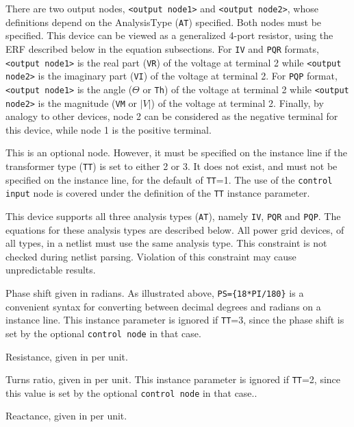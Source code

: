 \begin{Device}
\begin{Parameters}
There are two output nodes, \texttt{<output node1>} and \texttt{<output node2>}, 
whose definitions depend on the AnalysisType (\texttt{AT}) specified.  Both nodes
must be specified.  This device can be viewed as a generalized 4-port resistor, 
using the ERF described below in the equation subsections. For \texttt{IV} 
and \texttt{PQR} formats, \texttt{<output node1>} is the real part (\texttt{VR}) of 
the voltage at terminal 2 while \texttt{<output node2>} is the imaginary part 
(\texttt{VI}) of the voltage at terminal 2.  
For \texttt{PQP} format, \texttt{<output node1>} is the angle ($\Theta$ or \texttt{Th}) of the voltage 
at terminal 2 while \texttt{<output node2>} is the magnitude (\texttt{VM} or $|V|$) of the 
voltage at terminal 2.  Finally, by analogy to other \Xyce{} devices, node 2 can be 
considered as the negative terminal for this device, while node 1 is the positive
terminal.

This is an optional node.  However, it must be specified on the instance line if the 
transformer type (\texttt{TT}) is set to either 2 or 3.  It does not exist, and must 
not be specified on the instance line, for the default of \texttt{TT}=1.  The use of 
the \texttt{control input} node is covered under the definition of the \texttt{TT} 
instance parameter.

This device supports all three analysis types (\texttt{AT}), namely \texttt{IV}, 
\texttt{PQR} and \texttt{PQP}.  The equations for these analysis types are described 
below.  All power grid devices, of all types, in a \Xyce{} netlist must use the same 
analysis type.  This constraint is not checked during netlist parsing.  Violation of 
this constraint may cause unpredictable results.

Phase shift given in radians.  As illustrated above, \texttt{PS=\{18*PI/180\}} is a
convenient syntax for converting between decimal degrees and radians on a \Xyce{}
instance line.  This instance parameter is ignored if \texttt{TT}=3, since the
phase shift is set by the optional \texttt{control node} in that case.

Resistance, given in per unit.

Turns ratio, given in per unit.  This instance parameter is ignored if \texttt{TT}=2,
since this value is set by the optional \texttt{control node} in that case..

Reactance, given in per unit.


\end{Parameters}
\end{Device}
